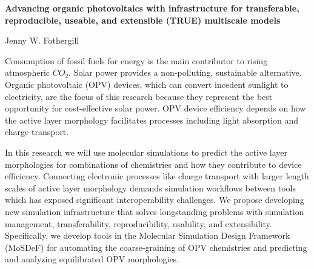 \documentclass{article}
\begin{document}
\begin{center}
    \large{\textbf{Advancing organic photovoltaics with infrastructure for transferable, reproducible, useable, and extensible (TRUE) multiscale models}}
\end{center}
\begin{center}
    Jenny W. Fothergill
\end{center}

Consumption of fossil fuels for energy is the main contributor to rising atmospheric $CO_{2}$. 
Solar power provides a non-polluting, sustainable alternative.
Organic photovoltaic (OPV) devices, which can convert incedent sunlight to electricity, are the focus of this research because they represent the best opportunity for cost-effective solar power.
OPV device efficiency depends on how the active layer morphology facilitates processes including light absorption and charge transport.

In this research we will use molecular simulations to predict the active layer morphologies for combinations of chemistries and how they contribute to device efficiency.
Connecting electronic processes like charge transport with larger length scales of active layer morphology demands simulation workflows between tools which has exposed significant interoperability challenges.
We propose developing new simulation infrastructure that solves longstanding problems with simulation management, transferability, reproducibility, usability, and extensibility.
Specifically, we develop tools in the Molecular Simulation Design Framework (MoSDeF) for automating the coarse-graining of OPV chemistries and predicting and analyzing equilibrated OPV morphologies.
\end{document}
